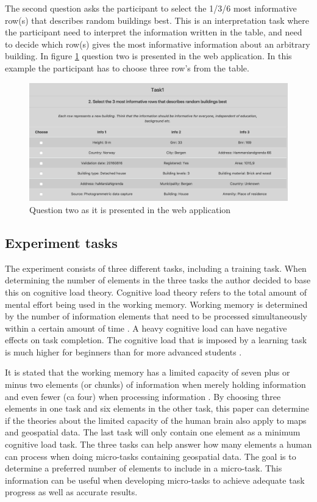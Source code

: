 The second question asks the participant to select the 1/3/6 most informative row(s) that describes random buildings best. This is an interpretation task where the participant need to interpret the information written in the table, and need to decide which row(s) gives the most informative information about an arbitrary building. In figure \ref{fig:q22} question two is presented in the web application. In this example the participant has to choose three row's from the table. 

\begin{figure}[H]
	\centering
	\includegraphics[width=0.8\linewidth]{fig/q2_2}
	\caption{Question two as it is presented in the web application}
	\label{fig:q22}
\end{figure}

\subsection{Experiment tasks}
The experiment consists of three different tasks, including a training task. When determining the number of elements in the three tasks the author decided to base this on cognitive load theory. Cognitive load theory refers to the total amount of mental effort being used in the working memory. Working memory is determined by the number of information elements that need to be processed simultaneously within a certain amount of time \citep{Barrouillet2007}. A heavy cognitive load can have negative effects on task completion. The cognitive load that is imposed by a learning task is much higher for beginners than for more advanced students \citep{Leppink2014a}.  

It is stated that the working memory has a limited capacity of seven plus or minus two elements (or chunks) of information when merely holding information and even fewer (ca four) when processing information \citep{Leppink2014a}. By choosing three elements in one task and six elements in the other task, this paper can determine if the theories about the limited capacity of the human brain also apply to maps and geospatial data. The last task will only contain one element as a minimum cognitive load task. The three tasks can help answer how many elements a human can process when doing micro-tasks containing geospatial data. The goal is to determine a preferred number of elements to include in a micro-task. This information can be useful when developing micro-tasks to achieve adequate task progress as well as accurate results.


